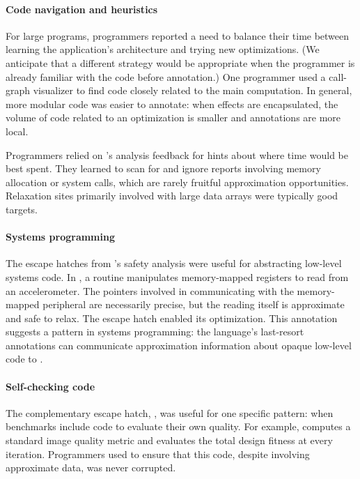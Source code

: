 \paragraph{Code navigation and heuristics}
For large programs, programmers reported a need to balance their time
between learning the application's architecture and trying new
optimizations.
(We anticipate that a different strategy would be appropriate when the
programmer is already familiar with the code before annotation.)
One programmer used a call-graph visualizer to find code closely related
to the main computation.
In general, more modular code was easier to annotate: when effects are
encapsulated, the volume of code related to an optimization is smaller
and annotations are more local.

Programmers relied on \sysname's analysis feedback for hints about where time
would be best spent.
They learned to scan for and ignore reports involving memory allocation
or system calls, which are rarely fruitful approximation opportunities.
Relaxation sites primarily involved with large data arrays were typically good
targets.

\paragraph{Systems programming}
The escape hatches from \sysname's safety analysis were useful for
abstracting low-level systems code.
In , a routine manipulates memory-mapped registers to read
from an accelerometer. The pointers involved in
communicating with the memory-mapped peripheral are necessarily precise, but
the reading itself is approximate and safe to relax.
The \annpermit escape hatch enabled its optimization.
This annotation suggests a pattern in systems programming: the language's
last-resort annotations can communicate approximation information about
opaque low-level code to \sysname.

\paragraph{Self-checking code}
The complementary escape hatch, \annforbid, was useful for one specific
pattern: when benchmarks include code to evaluate their own quality. For
example,  computes a standard image quality metric and
 evaluates the total design fitness at every iteration.
Programmers used \annforbid to ensure that this code, despite involving
approximate data, was never corrupted.

